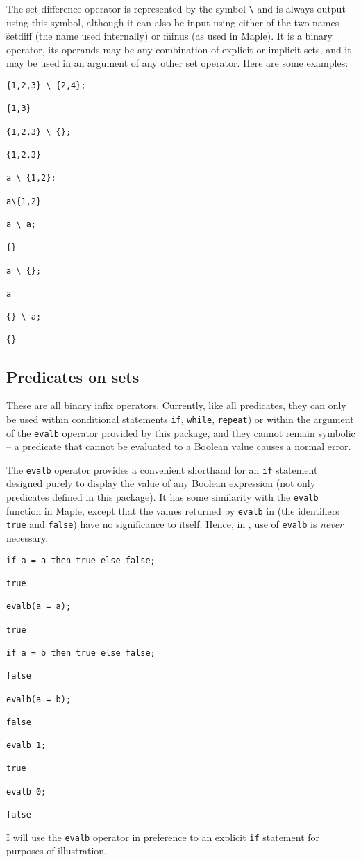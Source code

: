 The set difference operator is represented by the symbol \texttt{\textbackslash} and
is always output using this symbol, although it can also be input using
either of the two names \f{setdiff} (the name used internally) or
\f{minus} (as used in Maple).  It is a binary operator, its operands
may be any combination of explicit or implicit sets, and it may be
used in an argument of any other set operator.  Here are some
examples:
\begin{verbatim}
{1,2,3} \ {2,4};

{1,3}

{1,2,3} \ {};

{1,2,3}

a \ {1,2};

a\{1,2}

a \ a;

{}

a \ {};

a

{} \ a;

{}
\end{verbatim}


\subsection{Predicates on sets}
\hypertarget{operator:EVALB}{}

These are all binary infix operators.  Currently, like all \REDUCE
predicates, they can only be used within conditional statements
\texttt{if}, \texttt{while}, \texttt{repeat}) or within the argument of the
\texttt{evalb} operator provided by this package, and they cannot remain
symbolic -- a predicate that cannot be evaluated to a Boolean value
causes a normal \REDUCE error.

The \texttt{evalb} operator provides a convenient shorthand for an \texttt{if}
statement designed purely to display the value of any Boolean
expression (not only predicates defined in this package).  It has some
similarity with the \texttt{evalb} function in Maple, except that the
values returned by \texttt{evalb} in \REDUCE (the identifiers \texttt{true}
and \texttt{false}) have no significance to \REDUCE itself.  Hence, in
\REDUCE, use of \texttt{evalb} is \emph{never} necessary.
\begin{verbatim}
if a = a then true else false;

true

evalb(a = a);

true

if a = b then true else false;

false

evalb(a = b);

false

evalb 1;

true

evalb 0;

false
\end{verbatim}
I will use the \texttt{evalb} operator in preference to an explicit
\texttt{if} statement for purposes of illustration.


